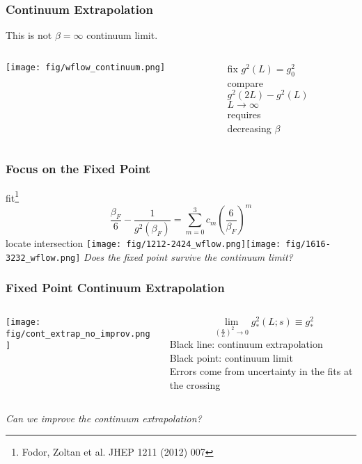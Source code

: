 \begin{frame}
  \frametitle{Continuum Extrapolation}
  This is not $\beta = \infty$ continuum limit.
  \begin{columns}
    \begin{column}{0.7\textwidth}
      \texttt{[image: fig/wflow\_continuum.png]}
    \end{column}
    \begin{column}{0.3\textwidth}
      \begin{center}
        fix $g^2(L)=g_0^2$\\\vspace{24pt}
        compare\\$g^2(2L)-g^2(L)$\\\vspace{24pt}
        $L\rightarrow \infty$\\requires\\decreasing $\beta$
      \end{center}
    \end{column}
  \end{columns}
\end{frame}

\begin{frame}
  \frametitle{Focus on the Fixed Point}
  fit\footnote{Fodor, Zoltan et al. JHEP 1211 (2012) 007} $$\frac{\beta_F}{6}-\frac{1}{g^2(\beta_F)}=\sum_{m=0}^3 c_m(\frac{6}{\beta_F})^m$$
    locate intersection
  \texttt{[image: fig/1212-2424\_wflow.png]}\texttt{[image: fig/1616-3232\_wflow.png]}
  \newline
  \emph{Does the fixed point survive the continuum limit?}
\end{frame}

\begin{frame}
  \frametitle{Fixed Point Continuum Extrapolation}
  \begin{columns}[T]
    \begin{column}{.65\textwidth}
      \texttt{[image: fig/cont\_extrap\_no\_improv.png]}
    \end{column}
    \begin{column}{.35\textwidth}
      \begin{equation*}
        \lim_{(\frac{a}{L})^2\to 0} g^2_*(L;s)\equiv g^2_*
      \end{equation*}
      \footnotesize
      Black line: continuum extrapolation\\
      \vspace{12pt}
      Black point: continuum limit\\
      \vspace{12pt}
      Errors come from uncertainty in the fits at the crossing
    \end{column}
  \end{columns}
  \vspace{12pt}
  \emph{Can we improve the continuum extrapolation?}
\end{frame}

